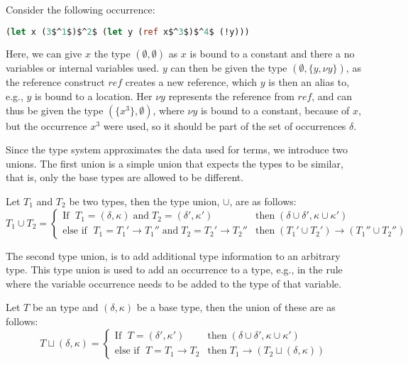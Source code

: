 \documentclass[../../master.tex]{subfiles}
\begin{document}
\begin{example}[]
Consider the following occurrence:
\begin{lstlisting}[language=Caml, mathescape=true]
(let x (3$^1$)$^2$ (let y (ref x$^3$)$^4$ (!y)))
\end{lstlisting}
Here, we can give $x$ the type $(\emptyset,\emptyset)$ as $x$ is bound to a constant and there a no variables or internal variables used.
$y$ can then be given the type $(\emptyset,\{y,\nu y\})$, as the reference construct $ref$ creates a new reference, which $y$ is then an alias to, e.g., $y$ is bound to a location.
Her $\nu y$ represents the reference from $ref$, and can thus be given the type $(\{x^3\},\emptyset)$, where $\nu y$ is bound to a constant, because of $x$, but the occurrence $x^3$ were used, so it should be part of the set of occurrences $\delta$.
\end{example}

Since the type system approximates the data used for terms, we introduce two unions.
The first union is a simple union that expects the types to be similar, that is, only the base types are allowed to be different.
\begin{definition}
	Let $T_1$ and $T_2$ be two types, then the type union, $\cup$, are as follows:
	\begin{equation*}
		T_1\cup T_2=
		\left\{\begin{matrix}
			\mbox{If } \; T_1=(\delta,\kappa) \;\mbox{and}\; T_2=(\delta',\kappa')  & \mbox{then} \; (\delta\cup\delta',\kappa\cup\kappa')\\
			\mbox{else if } \; T_1=T_1'\rightarrow T_1''\;\mbox{and}\;T_2=T_2'\rightarrow T_2'' & \mbox{then} \; (T_1'\cup T_2')\rightarrow (T_1''\cup T_2'')
		\end{matrix}\right.
	\end{equation*}
\end{definition}

The second type union, is to add additional type information to an arbitrary type.
This type union is used to add an occurrence to a type, e.g., in the  rule where the variable occurrence needs to be added to the type of that variable.
\begin{definition}
	Let $T$ be an type and $(\delta,\kappa)$ be a base type, then the union of these are as follows:
	\begin{equation*}
		T\sqcup (\delta,\kappa)=
		\left\{\begin{matrix}
			\mbox{If } \; T=(\delta',\kappa')  & \mbox{then} \; (\delta\cup\delta',\kappa\cup\kappa')\\
			\mbox{else if } \; T=T_1\rightarrow T_2 & \mbox{then} \; T_1\rightarrow(T_2\sqcup (\delta,\kappa))
		\end{matrix}\right.
	\end{equation*}
\end{definition}
\end{document}
